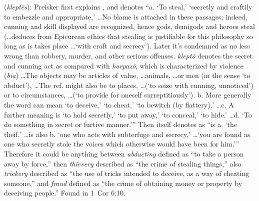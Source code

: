 \item[Fraudster,]

(\textit{kleptēs}):
Preisker first explains , and denotes ``a. `To steal,' `secretly and craftily to embezzle and appropriate,' \ldots No blame is attached in these passages; indeed, cunning and skill displayed are recognized, hence gods, demigods and heroes steal (\ldots deduces from Epicurean ethics that stealing is justifiable for this philosophy so long as is takes place \ldots `with craft and secrecy'). Later it's condemned as no less wrong than robbery, murder, and other serious offenses. \emph{kleptō} denotes the secret and cunning act as compared with \emph{harpazō}, which is characterized by violence (\emph{bia}) \ldots The objects may be articles of value, \ldots animals, \ldots or men (in the sense `to abduct'), \ldots The ref. might also be to places, \ldots (`to seize with cunning, unnoticed') or to circumstances, \ldots (`to provide for oneself surreptitiously'). b. More generally the word can mean `to deceive,' `to cheat,' `to bewitch (by flattery),' \ldots c. A further meaning is `to hold secretly,' `to put away,' `to conceal,' `to hide.' \ldots d. `To do something in secret or furtive manner.'''
Then  itself denotes as ``is a. `the theif,' \ldots is also b. `one who acts with subterfuge and secrecy,' \ldots `you are found as one who secretly stole the voices which otherwise would have been for him.'''
Therefore it could be anything between \emph{abducting} defined as ``to take a person away by force,'' then \emph{thievery} described as ``the crime of stealing things,'' also \emph{trickery} described as ``the use of tricks intended to deceive, as a way of cheating someone,'' and \emph{fraud} defined as ``the crime of obtaining money or property by deceiving people.''
Found in 1~Cor 6:10.
